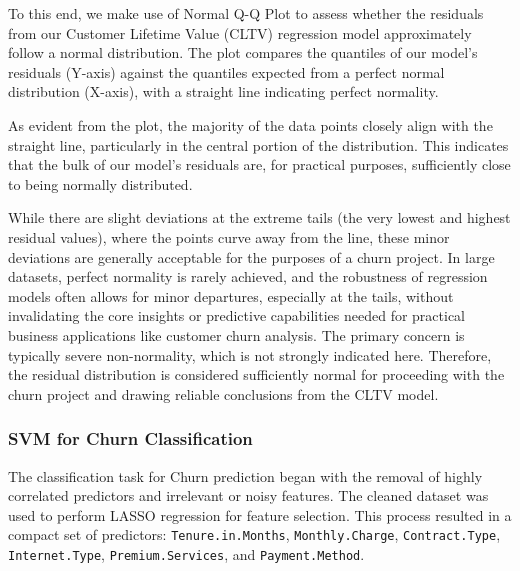 \documentclass[
]{article}
\begin{document}
To this end, we make use of Normal Q-Q Plot to assess whether the
residuals from our Customer Lifetime Value (CLTV) regression model
approximately follow a normal distribution. The plot compares the
quantiles of our model's residuals (Y-axis) against the quantiles
expected from a perfect normal distribution (X-axis), with a straight
line indicating perfect normality.

As evident from the plot, the majority of the data points closely align
with the straight line, particularly in the central portion of the
distribution. This indicates that the bulk of our model's residuals are,
for practical purposes, sufficiently close to being normally
distributed.

While there are slight deviations at the extreme tails (the very lowest
and highest residual values), where the points curve away from the line,
these minor deviations are generally acceptable for the purposes of a
churn project. In large datasets, perfect normality is rarely achieved,
and the robustness of regression models often allows for minor
departures, especially at the tails, without invalidating the core
insights or predictive capabilities needed for practical business
applications like customer churn analysis. The primary concern is
typically severe non-normality, which is not strongly indicated here.
Therefore, the residual distribution is considered sufficiently normal
for proceeding with the churn project and drawing reliable conclusions
from the CLTV model.

\hypertarget{svm-for-churn-classification}{%
\subsubsection{SVM for Churn
Classification}\label{svm-for-churn-classification}}

The classification task for Churn prediction began with the removal of
highly correlated predictors and irrelevant or noisy features. The
cleaned dataset was used to perform LASSO regression for feature
selection. This process resulted in a compact set of predictors:
\texttt{Tenure.in.Months}, \texttt{Monthly.Charge},
\texttt{Contract.Type}, \texttt{Internet.Type},
\texttt{Premium.Services}, and \texttt{Payment.Method}.
\end{document}

